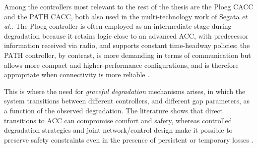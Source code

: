 Among the controllers most relevant to the rest of the thesis are the Ploeg CACC and the PATH CACC, both also used in the multi-technology work of Segata \emph{et al.}\cite{segata2023multi-technology}. The Ploeg controller is often employed as an intermediate stage during degradation because it retains logic close to an advanced ACC, with predecessor information received via radio, and supports constant time-headway policies; the PATH controller, by contrast, is more demanding in terms of communication but allows more compact and higher-performance configurations, and is therefore appropriate when connectivity is more reliable \cite{ploeg2011design,segata2016safe,segata2023multi-technology}.

This is where the need for \emph{graceful degradation} mechanisms arises, in which the system transitions between different controllers, and different gap parameters, as a function of the observed degradation. The literature shows that direct transitions to ACC can compromise comfort and safety, whereas controlled degradation strategies and joint network/control design make it possible to preserve safety constraints even in the presence of persistent or temporary losses \cite{ploeg2015graceful,giordano2019joint,segata2023multi-technology}.
